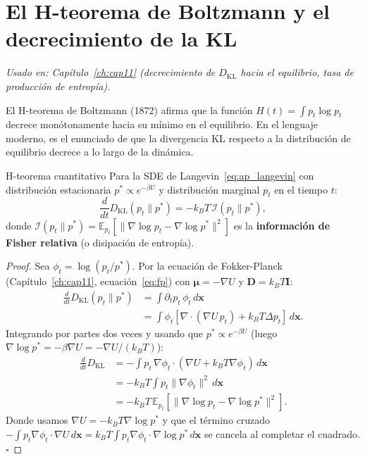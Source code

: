 \section{El H-teorema de Boltzmann y el decrecimiento de la KL}
\label{sec:ap_hteorema}

\textit{Usado en: Capítulo~\ref{ch:cap11} (decrecimiento de $D_{\mathrm{KL}}$
hacia el equilibrio, tasa de producción de entropía).}

\medskip
El H-teorema de Boltzmann (1872) afirma que la función $H(t) = \int p_t\log p_t$
decrece monótonamente hacia su mínimo en el equilibrio. En el lenguaje moderno,
es el enunciado de que la divergencia KL respecto a la distribución de equilibrio
decrece a lo largo de la dinámica.

\begin{teorema}{H-teorema cuantitativo}
\label{thm:ap_h}
Para la SDE de Langevin~\eqref{eq:ap_langevin} con distribución estacionaria
$p^*\propto e^{-\beta U}$ y distribución marginal $p_t$ en el tiempo $t$:
\begin{equation}
  \frac{d}{dt}D_{\mathrm{KL}}(p_t\|p^*)
  = -k_BT\,\mathcal{I}(p_t\|p^*),
  \label{eq:ap_h_cuantitativo}
\end{equation}
donde $\mathcal{I}(p_t\|p^*) = \mathbb{E}_{p_t}[\|\nabla\log p_t -
\nabla\log p^*\|^2]$ es la \textbf{información de Fisher relativa}
(o disipación de entropía).
\end{teorema}

\begin{proof}
Sea $\phi_t = \log(p_t/p^*)$. Por la ecuación de Fokker-Planck
(Capítulo~\ref{ch:cap11}, ecuación~\eqref{eq:fp}) con $\bm{\mu} = -\nabla U$
y $\bm{D} = k_BT\bm{I}$:
\begin{align*}
  \frac{d}{dt}D_{\mathrm{KL}}(p_t\|p^*)
  &= \int\partial_t p_t\,\phi_t\,d\bm{x} \\
  &= \int\phi_t\left[\nabla\cdot(\nabla U\,p_t) + k_BT\Delta p_t\right]\,d\bm{x}.
\end{align*}
Integrando por partes dos veces y usando que $p^*\propto e^{-\beta U}$ (luego
$\nabla\log p^* = -\beta\nabla U = -\nabla U/(k_BT)$):
\begin{align*}
  \frac{d}{dt}D_{\mathrm{KL}}
  &= -\int p_t\,\nabla\phi_t\cdot(\nabla U + k_BT\nabla\phi_t)\,d\bm{x}\\
  &= -k_BT\int p_t\|\nabla\phi_t\|^2\,d\bm{x}\\
  &= -k_BT\,\mathbb{E}_{p_t}[\|\nabla\log p_t - \nabla\log p^*\|^2].
\end{align*}
Donde usamos $\nabla U = -k_BT\nabla\log p^*$ y que el término cruzado
$-\int p_t\nabla\phi_t\cdot\nabla U\,d\bm{x} = k_BT\int p_t\nabla\phi_t\cdot
\nabla\log p^*\,d\bm{x}$ se cancela al completar el cuadrado. $\square$
\end{proof}


